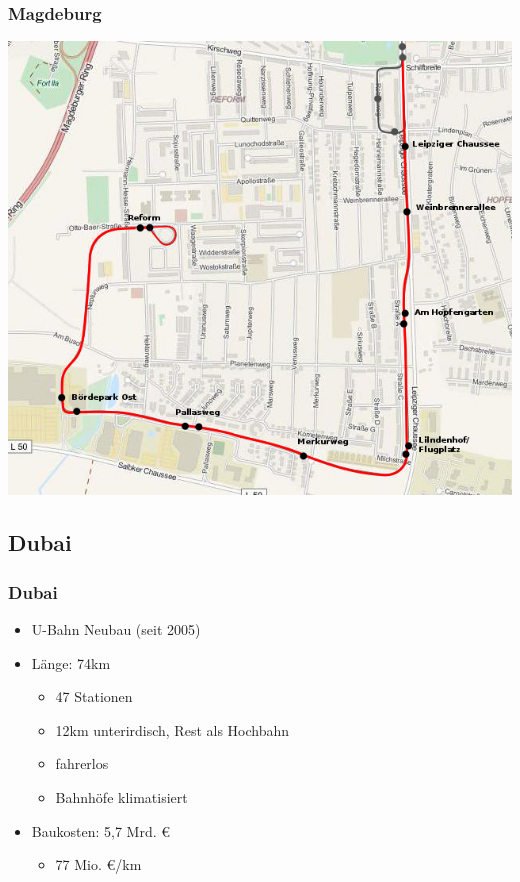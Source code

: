 \documentclass[xcolor=dvipsnames]{beamer}
\begin{document}

\begin{frame}
  \frametitle{Magdeburg}

  \begin{center}
    \includegraphics[height=.8\textheight]{data/Magdeburg.png}
  \end{center}
\end{frame}


\subsection{Dubai}
\begin{frame}
  \frametitle{Dubai}

  \begin{itemize}
  \item U-Bahn Neubau (seit 2005)
  \item Länge: 74km
    \begin{itemize}
    \item 47 Stationen
    \item 12km unterirdisch, Rest als Hochbahn
    \item fahrerlos
    \item Bahnhöfe klimatisiert
    \end{itemize}
  \item Baukosten: 5,7 Mrd. €
    \begin{itemize}
    \item 77 Mio. €/km
    \end{itemize}
  \end{itemize}
\end{frame}
\end{document}
